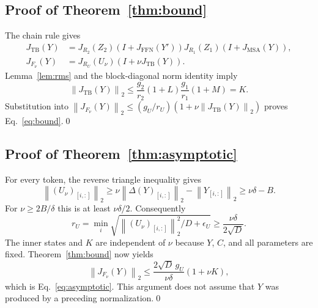 \documentclass[11pt]{article}
\newcommand{\MSA}{\operatorname{MSA}}
\newcommand{\FFN}{\operatorname{FFN}}
\newcommand{\TB}{\operatorname{TB}}
\newcommand{\norm}[1]{\left\|#1\right\|}
\numberwithin{equation}{section}
\begin{document}
\subsection{Proof of Theorem~\ref{thm:bound}}\label{app:bound}
The chain rule gives
\begin{align}
J_{\TB}(Y)
&=J_{R_2}(Z_2)(I+J_{\FFN}(Y'))J_{R_1}(Z_1)(I+J_{\MSA}(Y)),\\
J_{F_\nu}(Y)&=J_{R_U}(U_\nu)(I+\nu J_{\TB}(Y)).
\end{align}
Lemma~\ref{lem:rms} and the block-diagonal norm identity imply
\begin{equation}
\norm{J_{\TB}(Y)}_2
\leq\frac{g_2}{r_2}(1+L)\frac{g_1}{r_1}(1+M)=K.
\end{equation}
Substitution into
$\norm{J_{F_\nu}(Y)}_2\leq(g_U/r_U)(1+\nu\norm{J_{\TB}(Y)}_2)$
proves Eq.~\eqref{eq:bound}.\qed

\subsection{Proof of Theorem~\ref{thm:asymptotic}}\label{app:asymptotic}
For every token, the reverse triangle inequality gives
\begin{equation}
\norm{(U_\nu)_{[i,:]}}_2
\geq\nu\norm{\Delta(Y)_{[i,:]}}_2-\norm{Y_{[i,:]}}_2
\geq\nu\delta-B.
\end{equation}
For $\nu\geq2B/\delta$ this is at least $\nu\delta/2$. Consequently
\begin{equation}
r_U=\min_i\sqrt{\norm{(U_\nu)_{[i,:]}}_2^2/D+\epsilon_U}
\geq\frac{\nu\delta}{2\sqrt D}.
\end{equation}
The inner states and $K$ are independent of $\nu$ because $Y$, $C$, and all
parameters are fixed. Theorem~\ref{thm:bound} now yields
\begin{equation}
\norm{J_{F_\nu}(Y)}_2
\leq\frac{2\sqrt D\,g_U}{\nu\delta}(1+\nu K),
\end{equation}
which is Eq.~\eqref{eq:asymptotic}. This argument does not assume that $Y$ was
produced by a preceding normalization.\qed



\end{document}
